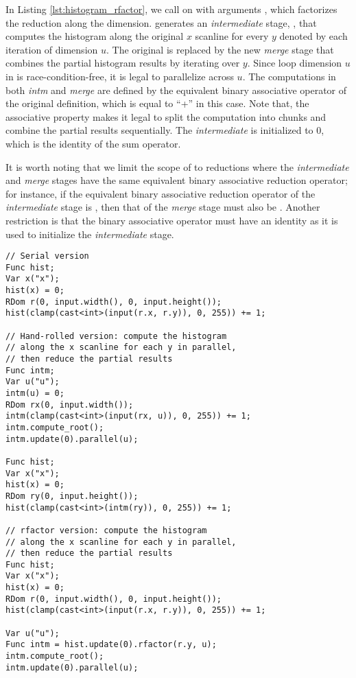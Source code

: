 In Listing \ref{lst:histogram_rfactor}, we call  on  with arguments , which factorizes the reduction along the  dimension.  generates an \emph{intermediate} stage, , that computes the histogram along the original $x$ scanline for every $y$ denoted by each iteration of dimension $u$. The original  is replaced by the new \emph{merge} stage that combines the partial histogram results by iterating over $y$. Since loop dimension $u$ in  is race-condition-free, it is legal to parallelize  across $u$. The computations in both \emph{intm} and \emph{merge} are defined by the equivalent binary associative operator of the original definition, which is equal to ``+'' in this case. Note that, the associative property makes it legal to split the computation into chunks and combine the partial results sequentially. The \emph{intermediate} is initialized to 0, which is the identity of the sum operator. 

It is worth noting that we limit the scope of  to reductions where the \emph{intermediate} and \emph{merge} stages have the same equivalent binary associative reduction operator; for instance, if the equivalent binary associative reduction operator of the \emph{intermediate} stage is , then that of the \emph{merge} stage must also be . Another restriction is that the binary associative operator must have an identity as it is used to initialize the \emph{intermediate} stage.

\begin{lstlisting}[caption={Histogram of a two-dimensional image: serial vs. parallel hand-rolled vs. parallel rfactor.}, label={lst:histogram_rfactor}]
// Serial version
Func hist;
Var x("x");
hist(x) = 0;
RDom r(0, input.width(), 0, input.height());
hist(clamp(cast<int>(input(r.x, r.y)), 0, 255)) += 1;

// Hand-rolled version: compute the histogram 
// along the x scanline for each y in parallel, 
// then reduce the partial results
Func intm;
Var u("u");
intm(u) = 0;
RDom rx(0, input.width());
intm(clamp(cast<int>(input(rx, u)), 0, 255)) += 1;
intm.compute_root();
intm.update(0).parallel(u);

Func hist;
Var x("x");
hist(x) = 0;
RDom ry(0, input.height());
hist(clamp(cast<int>(intm(ry)), 0, 255)) += 1;

// rfactor version: compute the histogram 
// along the x scanline for each y in parallel, 
// then reduce the partial results
Func hist;
Var x("x");
hist(x) = 0;
RDom r(0, input.width(), 0, input.height());
hist(clamp(cast<int>(input(r.x, r.y)), 0, 255)) += 1;

Var u("u");
Func intm = hist.update(0).rfactor(r.y, u);
intm.compute_root();
intm.update(0).parallel(u);
\end{lstlisting}


